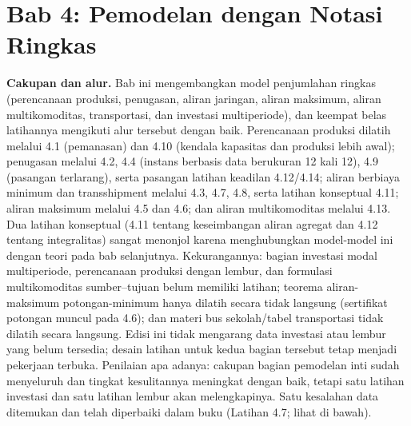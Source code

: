 \section{Bab 4: Pemodelan dengan Notasi Ringkas}

\textbf{Cakupan dan alur.} Bab ini mengembangkan model penjumlahan ringkas (perencanaan produksi, penugasan, aliran jaringan, aliran maksimum, aliran multikomoditas, transportasi, dan investasi multiperiode), dan keempat belas latihannya mengikuti alur tersebut dengan baik. Perencanaan produksi dilatih melalui 4.1 (pemanasan) dan 4.10 (kendala kapasitas dan produksi lebih awal); penugasan melalui 4.2, 4.4 (instans berbasis data berukuran 12 kali 12), 4.9 (pasangan terlarang), serta pasangan latihan keadilan 4.12/4.14; aliran berbiaya minimum dan transshipment melalui 4.3, 4.7, 4.8, serta latihan konseptual 4.11; aliran maksimum melalui 4.5 dan 4.6; dan aliran multikomoditas melalui 4.13. Dua latihan konseptual (4.11 tentang keseimbangan aliran agregat dan 4.12 tentang integralitas) sangat menonjol karena menghubungkan model-model ini dengan teori pada bab selanjutnya. Kekurangannya: bagian investasi modal multiperiode, perencanaan produksi dengan lembur, dan formulasi multikomoditas sumber--tujuan belum memiliki latihan; teorema aliran-maksimum potongan-minimum hanya dilatih secara tidak langsung (sertifikat potongan muncul pada 4.6); dan materi bus sekolah/tabel transportasi tidak dilatih secara langsung. Edisi ini tidak mengarang data investasi atau lembur yang belum tersedia; desain latihan untuk kedua bagian tersebut tetap menjadi pekerjaan terbuka. Penilaian apa adanya: cakupan bagian pemodelan inti sudah menyeluruh dan tingkat kesulitannya meningkat dengan baik, tetapi satu latihan investasi dan satu latihan lembur akan melengkapinya. Satu kesalahan data ditemukan dan telah diperbaiki dalam buku (Latihan 4.7; lihat di bawah).

